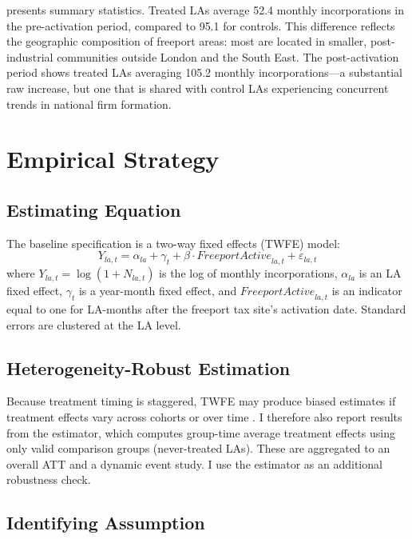 \documentclass[12pt]{article}
\begin{document}
 presents summary statistics. Treated LAs average 52.4 monthly incorporations in the pre-activation period, compared to 95.1 for controls. This difference reflects the geographic composition of freeport areas: most are located in smaller, post-industrial communities outside London and the South East. The post-activation period shows treated LAs averaging 105.2 monthly incorporations---a substantial raw increase, but one that is shared with control LAs experiencing concurrent trends in national firm formation.


\section{Empirical Strategy}\label{sec:empirics}

\subsection{Estimating Equation}

The baseline specification is a two-way fixed effects (TWFE) model:
\begin{equation}\label{eq:twfe}
  Y_{la,t} = \alpha_{la} + \gamma_t + \beta \cdot \textit{FreeportActive}_{la,t} + \varepsilon_{la,t}
\end{equation}
where $Y_{la,t} = \log(1 + N_{la,t})$ is the log of monthly incorporations, $\alpha_{la}$ is an LA fixed effect, $\gamma_t$ is a year-month fixed effect, and $\textit{FreeportActive}_{la,t}$ is an indicator equal to one for LA-months after the freeport tax site's activation date. Standard errors are clustered at the LA level.

\subsection{Heterogeneity-Robust Estimation}

Because treatment timing is staggered, TWFE may produce biased estimates if treatment effects vary across cohorts or over time \citep{goodman2021difference}. I therefore also report results from the \citet{callaway2021difference} estimator, which computes group-time average treatment effects using only valid comparison groups (never-treated LAs). These are aggregated to an overall ATT and a dynamic event study. I use the \citet{sun2021estimating} estimator as an additional robustness check.

\subsection{Identifying Assumption}
\end{document}
